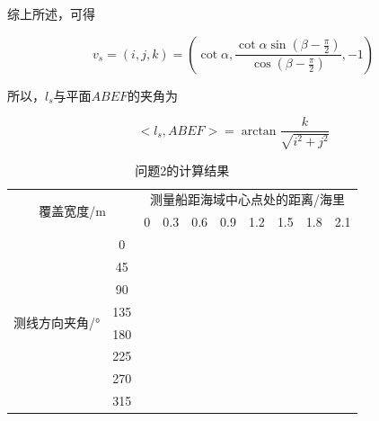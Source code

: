 综上所述，可得

\begin{equation}
    v_s 
    = (i, j, k)
    = \left( 
            \cot \alpha, 
            \frac{\cot\alpha \sin\left(\beta - \frac{\pi}{2}\right)}{\cos\left(\beta-\frac{\pi}{2}\right)},
            -1
            \right)
\end{equation}

所以，$l_s$与平面$ABEF$的夹角为

\begin{equation}
    <l_s, ABEF> = \arctan\frac{k}{\sqrt{i^2+j^2}}
\end{equation}

\begin{table}[h]
    \centering
    \caption{问题2的计算结果}
    \begin{tabular}{cccccccccc}
    \hline
    \multicolumn{2}{c}{\multirow{2}{*}{覆盖宽度/m}} & \multicolumn{8}{c}{测量船距海域中心点处的距离/海里}        \\ \cline{3-10} 
    \multicolumn{2}{c}{}                        & 0 & 0.3 & 0.6 & 0.9 & 1.2 & 1.5 & 1.8 & 2.1 \\ \hline
    \multirow{8}{*}{测线方向夹角/°}       & 0         &   &     &     &     &     &     &     &     \\
                                    & 45        &   &     &     &     &     &     &     &     \\
                                    & 90        &   &     &     &     &     &     &     &     \\
                                    & 135       &   &     &     &     &     &     &     &     \\
                                    & 180       &   &     &     &     &     &     &     &     \\
                                    & 225       &   &     &     &     &     &     &     &     \\
                                    & 270       &   &     &     &     &     &     &     &     \\
                                    & 315       &   &     &     &     &     &     &     &     \\ \hline
    \end{tabular}
\end{table}

